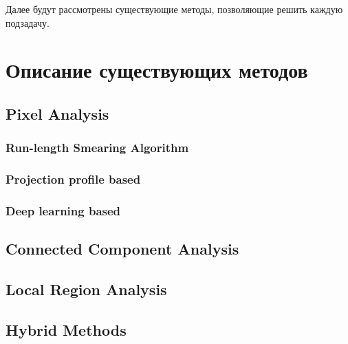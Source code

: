 Далее будут рассмотрены существующие методы, позволяющие решить каждую подзадачу.

\section{Описание существующих методов}


\cite{ddp}

\subsection{Pixel Analysis}

\subsubsection{Run-length Smearing Algorithm} %

\subsubsection{Projection profile based} %

\subsubsection{Deep learning based} %

\subsection{Connected Component Analysis}

\subsection{Local Region Analysis}

\subsection{Hybrid Methods}

